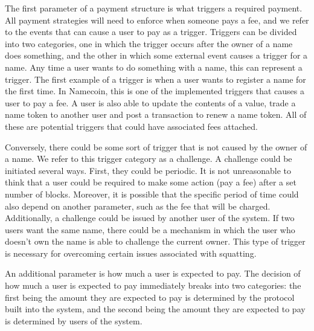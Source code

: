     The first parameter of a payment structure is what triggers a required payment. All payment strategies will need to enforce when someone pays a fee, and we refer to the events that can cause a user to pay as a trigger. Triggers can be divided into two categories, one in which the trigger occurs after the owner of a name does something, and the other in which some external event causes a trigger for a name. Any time a user wants to do something with a name, this can represent a trigger. The first example of a trigger is when a user wants to register a name for the first time. In Namecoin, this is one of the implemented triggers that causes a user to pay a fee. A user is also able to update the contents of a value, trade a name token to another user and post a transaction to renew a name token. All of these are potential triggers that could have associated fees attached. 

    Conversely, there could be some sort of trigger that is not caused by the owner of a name. We refer to this trigger category as a challenge. A challenge could be initiated several ways. First, they could be periodic. It is not unreasonable to think that a user could be required to make some action (pay a fee) after a set number of blocks. Moreover, it is possible that the specific period of time could also depend on another parameter, such as the fee that will be charged. Additionally, a challenge could be issued by another user of the system. If two users want the same name, there could be a mechanism in which the user who doesn't own the name is able to challenge the current owner. This type of trigger is necessary for overcoming certain issues associated with squatting. 

    An additional parameter is how much a user is expected to pay. The decision of how much a user is expected to pay immediately breaks into two categories: the first being the amount they are expected to pay is determined by the protocol built into the system, and the second being the amount they are expected to pay is determined by users of the system. 

